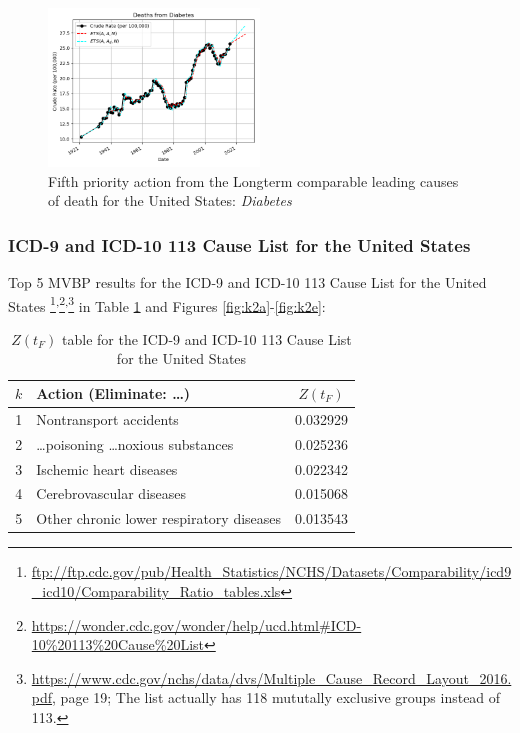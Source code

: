 \documentclass[10pt, a4paper, twocolumn]{IEEEconf}
\newcommand\footnotesstartsep{}
\newcommand\footnotescontinue{\textsuperscript{,}}
\begin{document}
\begin{figure}[H]
  \centering
  \includegraphics[width=0.5\textwidth]{results/US_ICD_LONGTERM_COMPARABLE_LEADING/Diabetes_ets.png}
  \caption{Fifth priority action from the Longterm comparable leading causes of death for the United States: \textit{Diabetes}}\label{fig:k1e}
\end{figure}

\clearpage

\subsubsection{ICD-9 and ICD-10 113 Cause List for the United States}

Top 5 MVBP results for the ICD-9 and ICD-10 113 Cause List for the United States \citep{nbermortality,anderson2001comparability,centers2017underlying,icdcomparabilityratios}\footnotesstartsep\footnote{\scriptsize{\url{ftp://ftp.cdc.gov/pub/Health_Statistics/NCHS/Datasets/Comparability/icd9_icd10/Comparability_Ratio_tables.xls}}}\footnotescontinue\footnote{\scriptsize{\url{https://wonder.cdc.gov/wonder/help/ucd.html\#ICD-10\%20113\%20Cause\%20List}}}\footnotescontinue\footnote{\scriptsize{\url{https://www.cdc.gov/nchs/data/dvs/Multiple_Cause_Record_Layout_2016.pdf}, page 19; The list actually has 118 mututally exclusive groups instead of 113.}} in Table \ref{table:ztable2} and Figures \ref{fig:k2a}-\ref{fig:k2e}:

\begin{table}[H]
  \centering
  \begin{tabular}{clc}
    \toprule
      $k$ & Action (Eliminate: \ldots) & $Z(t_F)$ \\
    \midrule
      1 &                      Nontransport accidents & 0.032929 \\
      2 &  \ldots poisoning \ldots noxious substances & 0.025236 \\
      3 &                     Ischemic heart diseases & 0.022342 \\
      4 &                    Cerebrovascular diseases & 0.015068 \\
      5 &    Other chronic lower respiratory diseases & 0.013543 \\
  \end{tabular}
  \caption{$Z(t_F)$ table for the ICD-9 and ICD-10 113 Cause List for the United States}
  \label{table:ztable2}
\end{table}
\end{document}
